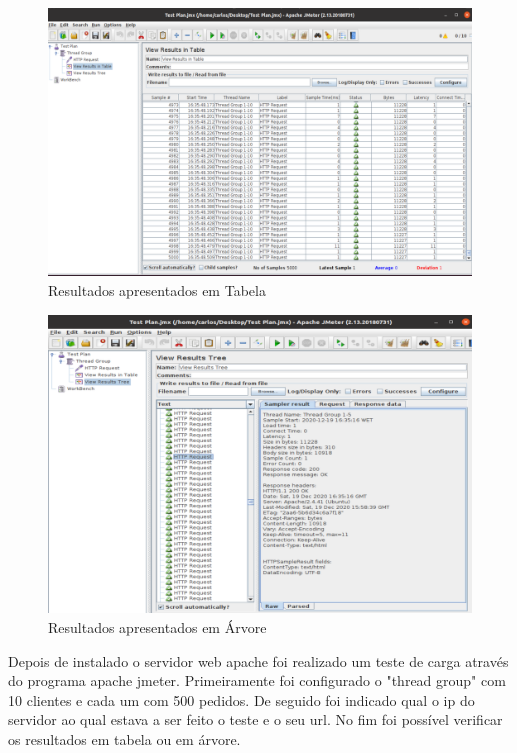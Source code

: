 \documentclass{article}
\begin{document}
	\begin{figure}[!htb]
	\centering
	\includegraphics[scale=0.5]{tp_sosd_c3}
	\caption{Resultados apresentados em Tabela}
	\end{figure}

	\newpage
	
	\begin{figure}[!htb]
		\centering
		\includegraphics[scale=0.5]{tp_sosd_c4}
		\caption{Resultados apresentados em Árvore}
	\end{figure}
	
	\vspace{3 em}
	
	Depois de instalado o servidor web apache foi realizado um teste de carga através do programa apache jmeter. Primeiramente foi configurado o "thread group" com 10 clientes e cada um com 500 pedidos. De seguido foi indicado qual o ip do servidor ao qual estava a ser feito o teste e o seu url.
	No fim foi possível verificar os resultados em tabela ou em árvore. 
	
\end{document}
